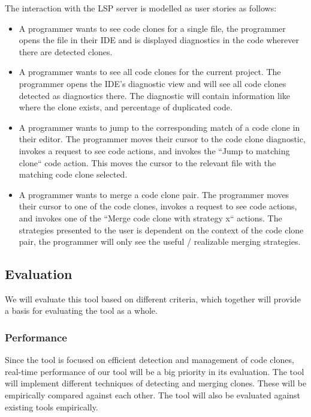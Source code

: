 \documentclass[12pt]{article}
\begin{document}
The interaction with the LSP server is modelled as user stories as follows:

\begin{itemize}
	\item A programmer wants to see code clones for a single file, the
	      programmer opens the file in their IDE and is displayed diagnostics in the code
	      wherever there are detected clones.

	\item A programmer wants to see all code clones for the current project. The
	      programmer opens the IDE's diagnostic view and will see all code clones detected
	      as diagnostics there. The diagnostic will contain information like where the clone
	      exists, and percentage of duplicated code.

	\item A programmer wants to jump to the corresponding match of a code clone in their
	      editor. The programmer moves their cursor to the code clone diagnostic, invokes a
	      request to see code actions, and invokes the ``Jump to matching clone`` code
	      action. This moves the cursor to the relevant file with the matching code clone
	      selected.

	\item A programmer wants to merge a code clone pair. The programmer moves their cursor
	      to one of the code clones, invokes a request to see code actions, and invokes one
	      of the ``Merge code clone with strategy x`` actions. The strategies presented to
	      the user is dependent on the context of the code clone pair, the programmer will
	      only see the useful / realizable merging strategies.
\end{itemize}

\subsection{Evaluation}

We will evaluate this tool based on different criteria, which together will provide a
basis for evaluating the tool as a whole.

\subsubsection{Performance}

Since the tool is focused on efficient detection and management of code clones, real-time
performance of our tool will be a big priority in its evaluation. The tool will implement
different techniques of detecting and merging clones. These will be empirically compared
against each other. The tool will also be evaluated against existing tools empirically.
\end{document}
